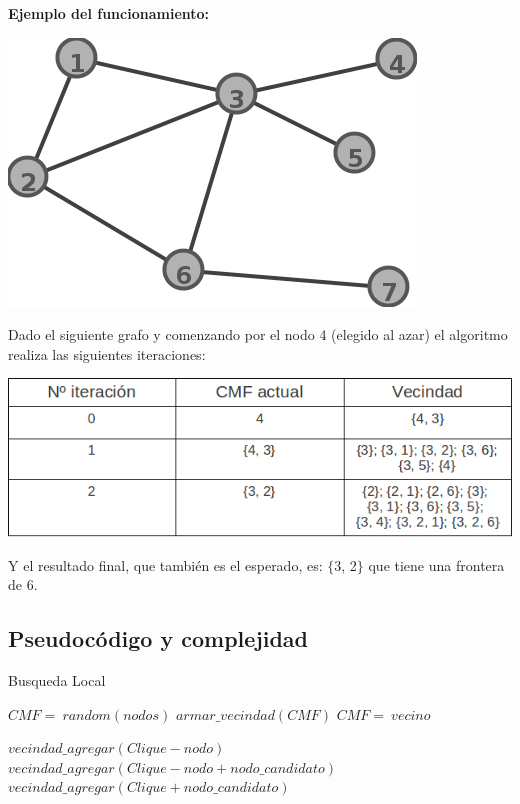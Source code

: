 \textbf{Ejemplo del funcionamiento:}

\begin{center}
\includegraphics[scale=0.5]{Images/ejemploGrafo.png} 
\end{center}

Dado el siguiente grafo y comenzando por el nodo 4 (elegido al azar) el algoritmo realiza las siguientes iteraciones:
\begin{center}
\includegraphics[scale=0.7]{Images/EjemploLocal.png} 
\end{center}

Y el resultado final, que también es el esperado, es: $\lbrace $3, 2$\rbrace$ que tiene una frontera de 6.

\subsection{Pseudoc\'odigo y complejidad}
\begin{algorithm}
	\caption{Busqueda Local}\label{local}
	\begin{algorithmic}[1]
		\State $CMF=\ random(nodos)$	
					
			\State $armar\_ vecindad(CMF)$
					\State $CMF=\ vecino$
				\EndIf
			\EndFor
		\EndWhile
	\EndProcedure
	\State

				\State $vecindad\_agregar(Clique-nodo)$
					\State $vecindad\_agregar(Clique-nodo+nodo\_candidato)$
				\EndFor
			\EndFor
		\EndIf
			\State $vecindad\_agregar(Clique+nodo\_candidato)$
		\EndFor
	\EndProcedure
\end{algorithmic}
\end{algorithm}

